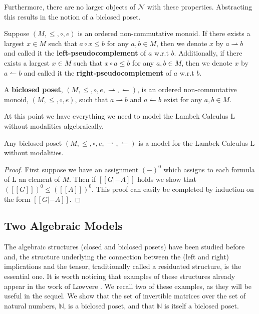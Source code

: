 \documentclass{llncs}
\newcommand{\N}{\mathcal{N}}
\newcommand{\rto}{\leftharpoonup}
\newcommand{\lto}{\rightharpoonup}
\begin{document}
Furthermore, there are no larger objects of $\N$ with these
properties.  Abstracting this results in the notion of a biclosed
poset.
\begin{definition}
  \label{def:biclosed-poset}
  Suppose $(M, \leq, \circ, e)$ is an ordered non-commutative monoid.
  If there exists a largest $x \in M$ such that $a \circ x \leq b$ for
  any $a, b \in M$, then we denote $x$ by $a \lto b$ and called it
  the \textbf{left-pseudocomplement} of $a$ w.r.t $b$.  Additionally,
  if there exists a largest $x \in M$ such that $x \circ a \leq b$ for
  any $a, b \in M$, then we denote $x$ by $a \rto b$ and called it
  the \textbf{right-pseudocomplement} of $a$ w.r.t $b$.

  A \textbf{biclosed poset}, $(M, \leq, \circ, e, \lto, \rto)$, is an  ordered non-commutative monoid, $(M, \leq, \circ, e)$, such that $a
  \lto b$ and $a \rto b$ exist for any $a,b \in M$.
\end{definition}

At this point we have everything we need to model the Lambek Calculus L without modalities algebraically.
\begin{lemma}
  \label{lemma:biclosed-poset-model-L}
  Any biclosed poset $(M, \leq, \circ, e, \lto, \rto)$ is a model for  the Lambek Calculus L without modalities.
\end{lemma}
\begin{proof}
  First suppose we have an assignment $(-)^0$ which assigns to each
  formula of L an element of $M$.  Then if $[[G |- A]]$ holds we
  show that $([[G]])^0 \leq ([[A]])^0$.  This proof can easily be
  completed by induction on the form $[[G |- A]]$.  
\end{proof}

\subsection{Two  Algebraic Models}
\label{subsec:two_example_algebraic_models}

The algebraic structures (closed and biclosed posets) have been studied before and, the structure underlying the
connection between the (left and right) implications and the tensor, traditionally  called a residuated structure, is the essential one. It is worth noticing that  examples of these structures already appear in the work of Lawvere \cite{lawvere1973}. We recall two of these  examples, as they will be useful in the sequel.  
We show that the set of invertible matrices over the set of
natural numbers, $\mathbb{N}$, is a biclosed poset, and that $\mathbb{N}$ is itself a biclosed poset.
\vspace{-10px}
\end{document}
